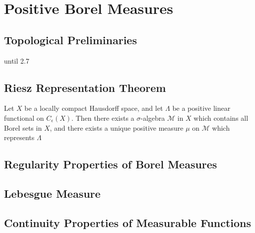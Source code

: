 \chapter{Positive Borel Measures}
\section{Topological Preliminaries}
until 2.7



\section{Riesz Representation Theorem}
\begin{theorem}
Let $X$ be a locally compact Hausdorff space, and let $\Lambda$ be a positive linear functional on $C_\epsilon(X)$. Then there exists a $\sigma$-algebra $\mathcal{M}$ in $X$ which contains all Borel sets in $X$, and there exists a unique positive measure $\mu$ on $\mathcal{M}$ which represents $\Lambda$
\end{theorem}

\section{Regularity Properties of Borel Measures}
\section{Lebesgue Measure}
\section{Continuity Properties of Measurable Functions}